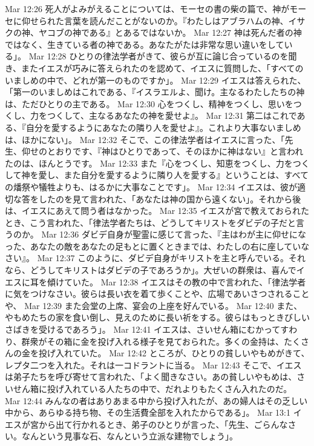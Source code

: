 Mar 12:26  死人がよみがえることについては、モーセの書の柴の篇で、神がモーセに仰せられた言葉を読んだことがないのか。『わたしはアブラハムの神、イサクの神、ヤコブの神である』とあるではないか。
Mar 12:27  神は死んだ者の神ではなく、生きている者の神である。あなたがたは非常な思い違いをしている」。
Mar 12:28  ひとりの律法学者がきて、彼らが互に論じ合っているのを聞き、またイエスが巧みに答えられたのを認めて、イエスに質問した、「すべてのいましめの中で、どれが第一のものですか」。
Mar 12:29  イエスは答えられた、「第一のいましめはこれである、『イスラエルよ、聞け。主なるわたしたちの神は、ただひとりの主である。
Mar 12:30  心をつくし、精神をつくし、思いをつくし、力をつくして、主なるあなたの神を愛せよ』。
Mar 12:31  第二はこれである、『自分を愛するようにあなたの隣り人を愛せよ』。これより大事ないましめは、ほかにない」。
Mar 12:32  そこで、この律法学者はイエスに言った、「先生、仰せのとおりです、『神はひとりであって、そのほかに神はない』と言われたのは、ほんとうです。
Mar 12:33  また『心をつくし、知恵をつくし、力をつくして神を愛し、また自分を愛するように隣り人を愛する』ということは、すべての燔祭や犠牲よりも、はるかに大事なことです」。
Mar 12:34  イエスは、彼が適切な答をしたのを見て言われた、「あなたは神の国から遠くない」。それから後は、イエスにあえて問う者はなかった。
Mar 12:35  イエスが宮で教えておられたとき、こう言われた、「律法学者たちは、どうしてキリストをダビデの子だと言うのか。
Mar 12:36  ダビデ自身が聖霊に感じて言った、『主はわが主に仰せになった、あなたの敵をあなたの足もとに置くときまでは、わたしの右に座していなさい』。
Mar 12:37  このように、ダビデ自身がキリストを主と呼んでいる。それなら、どうしてキリストはダビデの子であろうか」。大ぜいの群衆は、喜んでイエスに耳を傾けていた。
Mar 12:38  イエスはその教の中で言われた、「律法学者に気をつけなさい。彼らは長い衣を着て歩くことや、広場であいさつされることや、
Mar 12:39  また会堂の上席、宴会の上座を好んでいる。
Mar 12:40  また、やもめたちの家を食い倒し、見えのために長い祈をする。彼らはもっときびしいさばきを受けるであろう」。
Mar 12:41  イエスは、さいせん箱にむかってすわり、群衆がその箱に金を投げ入れる様子を見ておられた。多くの金持は、たくさんの金を投げ入れていた。
Mar 12:42  ところが、ひとりの貧しいやもめがきて、レプタ二つを入れた。それは一コドラントに当る。
Mar 12:43  そこで、イエスは弟子たちを呼び寄せて言われた、「よく聞きなさい。あの貧しいやもめは、さいせん箱に投げ入れている人たちの中で、だれよりもたくさん入れたのだ。
Mar 12:44  みんなの者はありあまる中から投げ入れたが、あの婦人はその乏しい中から、あらゆる持ち物、その生活費全部を入れたからである」。
Mar 13:1  イエスが宮から出て行かれるとき、弟子のひとりが言った、「先生、ごらんなさい。なんという見事な石、なんという立派な建物でしょう」。
